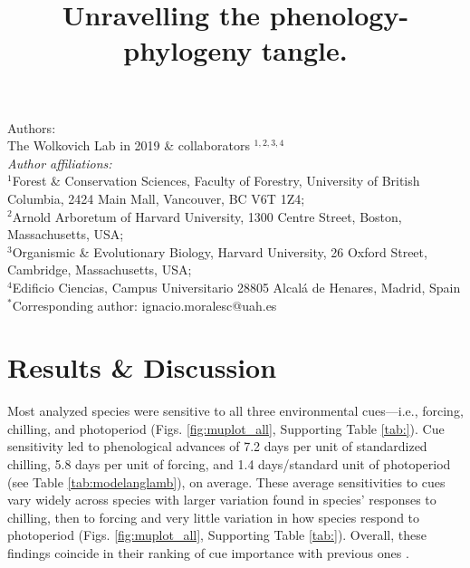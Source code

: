 \documentclass{article}\usepackage[]{graphicx}\usepackage[]{color}
\title{Unravelling the phenology-phylogeny tangle.}
\begin{document}
\maketitle

\noindent Authors:\\
The Wolkovich Lab in 2019 \& collaborators $^{1,2,3,4}$ %
\vspace{2ex}\\
\emph{Author affiliations:}\\
$^{1}$Forest \& Conservation Sciences, Faculty of Forestry, University of British Columbia, 2424 Main Mall, Vancouver, BC V6T 1Z4;\\
$^{2}$Arnold Arboretum of Harvard University, 1300 Centre Street, Boston, Massachusetts, USA;\\
$^{3}$Organismic \& Evolutionary Biology, Harvard University, 26 Oxford Street, Cambridge, Massachusetts, USA;\\
$^{4}$Edificio Ciencias, Campus Universitario 28805 Alcalá de Henares, Madrid, Spain\\
 

\vspace{2ex}
$^*$Corresponding author: ignacio.moralesc@uah.es\\
\renewcommand{\thetable}{\arabic{table}}
\renewcommand{\thefigure}{\arabic{figure}}
\renewcommand{\labelitemi}{$-$}

\clearpage







\section*{Results \& Discussion}

Most analyzed species were sensitive to all three environmental cues---i.e., forcing, chilling, and photoperiod (Figs. \ref{fig:muplot_all}, Supporting Table \ref{tab:}). Cue sensitivity led to phenological advances of 7.2 days per unit of standardized chilling, 5.8 days per unit of forcing, and 1.4 days/standard unit of photoperiod (see Table \ref{tab:modelanglamb}), on average. These average sensitivities to cues vary widely across species with larger variation found in species' responses to chilling, then to forcing and very little variation in how  species respond to photoperiod (Figs. \ref{fig:muplot_all}, Supporting Table \ref{tab:}). Overall, these findings coincide in their ranking of cue importance with previous ones \citep{ettinger2020}.\\
\end{document}
